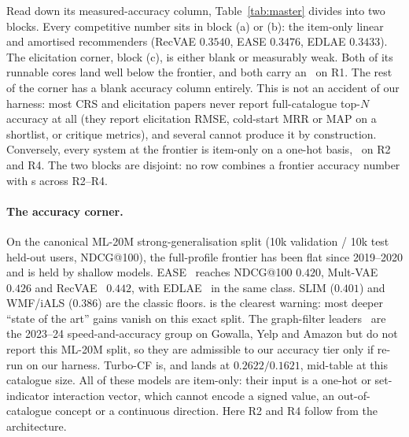 \documentclass[manuscript,screen,review]{acmart}
\newcommand{\cmark}{\ding{51}}
\newcommand{\xmark}{\ding{55}}
\begin{document}
Read down its measured-accuracy column, Table~\ref{tab:master} divides into two blocks. Every competitive number sits in block (a) or (b): the item-only linear and amortised recommenders (RecVAE $0.3540$, EASE $0.3476$, EDLAE $0.3433$). The elicitation corner, block (c), is either blank or measurably weak. Both of its runnable cores land well below the frontier, and both carry an \xmark\ on R1. The rest of the corner has a blank accuracy column entirely. This is not an accident of our harness: most CRS and elicitation papers never report full-catalogue top-$N$ accuracy at all (they report elicitation RMSE, cold-start MRR or MAP on a shortlist, or critique metrics), and several cannot produce it by construction. Conversely, every system at the frontier is item-only on a one-hot basis, \xmark\ on R2 and R4. The two blocks are disjoint: no row combines a frontier accuracy number with \cmark s across R2--R4.

\paragraph{The accuracy corner.} On the canonical ML-20M strong-generalisation split (10k validation / 10k test held-out users, NDCG@100), the full-profile frontier has been flat since 2019--2020 and is held by shallow models. EASE~\citep{steck2019ease} reaches NDCG@100 $0.420$, Mult-VAE~\citep{liang2018variational} $0.426$ and RecVAE~\citep{ren2020recvae} $0.442$, with EDLAE~\citep{steck2020edlae} in the same class. SLIM ($0.401$) and WMF/iALS ($0.386$) are the classic floors. \citet{dacrema2019progress} is the clearest warning: most deeper ``state of the art'' gains vanish on this exact split. The graph-filter leaders~\citep{shen2021gfcf,choi2023bspm,park2024turbocf} are the 2023--24 speed-and-accuracy group on Gowalla, Yelp and Amazon but do not report this ML-20M split, so they are admissible to our accuracy tier only if re-run on our harness. Turbo-CF is, and lands at $0.2622/0.1621$, mid-table at this catalogue size. All of these models are item-only: their input is a one-hot or set-indicator interaction vector, which cannot encode a signed value, an out-of-catalogue concept or a continuous direction. Here R2 and R4 follow from the architecture.
\end{document}
